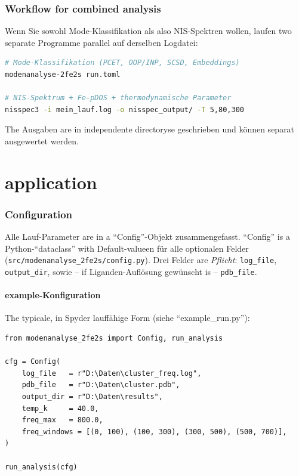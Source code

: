 \documentclass[11pt,a4paper,twoside]{article}
\theoremstyle{remark}
\begin{document}
\section{Workflow for combined analysis}

Wenn Sie sowohl Mode-Klassifikation als also NIS-Spektren wollen,
laufen two separate Programme parallel auf derselben Logdatei:

\begin{lstlisting}[language=bash]
# Mode-Klassifikation (PCET, OOP/INP, SCSD, Embeddings)
modenanalyse-2fe2s run.toml

# NIS-Spektrum + Fe-pDOS + thermodynamische Parameter
nisspec3 -i mein_lauf.log -o nisspec_output/ -T 5,80,300
\end{lstlisting}

The Ausgaben are in independente directoryse geschrieben und
k\"onnen separat ausgewertet werden.




\part{application}

\section{Configuration}
\label{sec:konfig}

Alle Lauf-Parameter are in a ``Config''-Objekt zusammengefasst.
``Config'' is a Python-``dataclass'' with Default-valueen f\"ur alle
optionalen Felder (\texttt{src/modenanalyse\_2fe2s/config.py}). Drei
Felder are \emph{Pflicht}: \texttt{log\_file}, \texttt{output\_dir},
sowie -- if Liganden-Aufl\"osung gew\"unscht is --
\texttt{pdb\_file}.

\subsection{example-Konfiguration}

The typicale, in Spyder lauff\"ahige Form (siehe ``example\_run.py''):

\begin{lstlisting}[style=python]
from modenanalyse_2fe2s import Config, run_analysis

cfg = Config(
    log_file   = r"D:\Daten\cluster_freq.log",
    pdb_file   = r"D:\Daten\cluster.pdb",
    output_dir = r"D:\Daten\results",
    temp_k     = 40.0,
    freq_max   = 800.0,
    freq_windows = [(0, 100), (100, 300), (300, 500), (500, 700)],
)

run_analysis(cfg)
\end{lstlisting}
\end{document}
